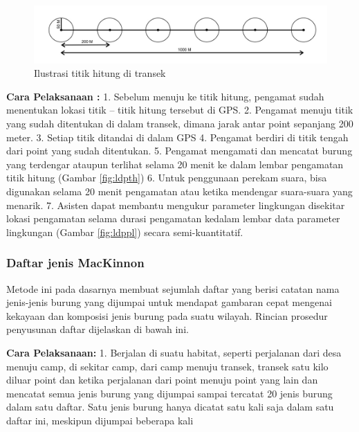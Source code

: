 \documentclass[
]{book}
\begin{document}
\begin{figure}

{\centering \includegraphics[width=1\linewidth]{images/pc_ilustration} 

}

\caption{Ilustrasi titik hitung di transek}\label{fig:figpc}
\end{figure}

\textbf{Cara Pelaksanaan :}
1. Sebelum menuju ke titik hitung, pengamat sudah menentukan lokasi titik -- titik hitung tersebut di GPS.
2. Pengamat menuju titik yang sudah ditentukan di dalam transek, dimana jarak antar point sepanjang 200 meter.
3. Setiap titik ditandai di dalam GPS
4. Pengamat berdiri di titik tengah dari point yang sudah ditentukan.
5. Pengamat mengamati dan mencatat burung yang terdengar ataupun terlihat selama 20 menit ke dalam lembar pengamatan titik hitung (Gambar \ref{fig:ldpth})
6. Untuk penggunaan perekam suara, bisa digunakan selama 20 menit pengamatan atau ketika mendengar suara-suara yang menarik.
7. Asisten dapat membantu mengukur parameter lingkungan disekitar lokasi pengamatan selama durasi pengamatan kedalam lembar data parameter lingkungan (Gambar \ref{fig:ldppl}) secara semi-kuantitatif.

\hypertarget{daftar-jenis-mackinnon}{%
\subsubsection*{Daftar jenis MacKinnon}\label{daftar-jenis-mackinnon}}

Metode ini pada dasarnya membuat sejumlah daftar yang berisi catatan nama jenis-jenis burung yang dijumpai untuk mendapat gambaran cepat mengenai kekayaan dan komposisi jenis burung pada suatu wilayah. Rincian prosedur penyusunan daftar dijelaskan di bawah ini.

\textbf{Cara Pelaksanaan:}
1. Berjalan di suatu habitat, seperti perjalanan dari desa menuju camp, di sekitar camp, dari camp menuju transek, transek satu kilo diluar point dan ketika perjalanan dari point menuju point yang lain dan mencatat semua jenis burung yang dijumpai sampai tercatat 20 jenis burung dalam satu daftar. Satu jenis burung hanya dicatat satu kali saja dalam satu daftar ini, meskipun dijumpai beberapa kali
\end{document}
